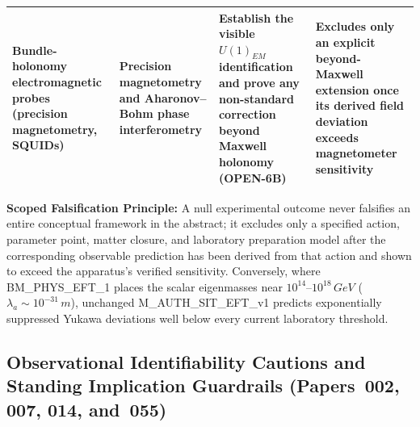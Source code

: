 \documentclass[american,11pt,letterpaper]{article}
\def\mathrm#1{#1}%
\def\texttt#1{#1}%
\def\emph#1{#1}%
\begin{document}
\begin{table}[htbp]
\begin{tabular}{|p{3.3cm}|p{2.9cm}|p{4.2cm}|p{4.1cm}|}
\hline
\textbf{Bundle-holonomy electromagnetic probes} (precision magnetometry, SQUIDs) & Precision magnetometry and Aharonov--Bohm phase interferometry & Establish the visible $U(1)_{\mathrm{EM}}$ identification and prove any non-standard correction beyond Maxwell holonomy (\texttt{OPEN-6B}) & Excludes only an explicit beyond-Maxwell extension once its derived field deviation exceeds magnetometer sensitivity \\
\hline
\end{tabular}
\end{table}

\noindent
\textbf{Scoped Falsification Principle:} A null experimental outcome never falsifies an entire conceptual framework in the abstract; it excludes only a \emph{specified action, parameter point, matter closure, and laboratory preparation model} after the corresponding observable prediction has been derived from that action and shown to exceed the apparatus's verified sensitivity. Conversely, where \texttt{BM\_PHYS\_EFT\_1} places the scalar eigenmasses near $10^{14}\text{--}10^{18}\,\mathrm{GeV}$ ($\lambda_a \sim 10^{-31}\,\mathrm{m}$), unchanged \texttt{M\_AUTH\_SIT\_EFT\_v1} predicts exponentially suppressed Yukawa deviations well below every current laboratory threshold.

\subsection{Observational Identifiability Cautions and Standing Implication Guardrails (Papers~002, 007, 014, and~055)}
\label{subsec:identifiability-and-qgtcd-guardrails}
\end{document}
